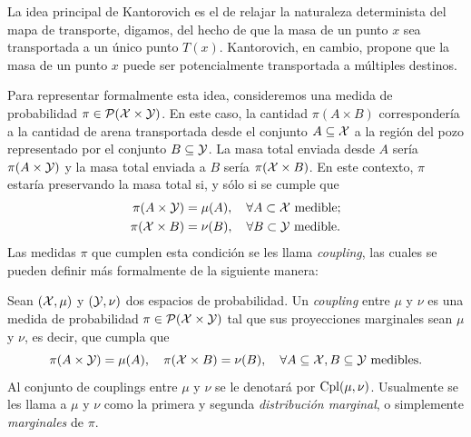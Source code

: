 {{	  La idea principal de Kantorovich es el de relajar la naturaleza determinista del mapa de transporte, digamos, del hecho de que la masa de un punto $x$ sea transportada a un único punto $T(x)$. Kantorovich, en cambio, propone que la masa de un punto $x$ puede ser potencialmente transportada a múltiples destinos.


	  Para representar formalmente esta idea, consideremos una medida de probabilidad $\pi \in \ProbSpace[\cX \times \cY]$. En este caso, la cantidad $\pi(A \times B)$ correspondería a la cantidad de arena transportada desde el conjunto $A \subseteq \cX$ a la región del pozo representado por el conjunto $B \subseteq \cY$. La masa total enviada desde $A$ sería $\pi(A \times \cY)$ y la masa total enviada a $B$ sería $\pi(\cX \times B)$. En este contexto, $\pi$ estaría preservando la masa total si, y sólo si se cumple que
	  \begin{align*}
		  \pi(A \times \cY) & = \mu(A), \quad \forall A \subset \cX \text{ medible;} \\
		  \pi(\cX \times B) & = \nu(B),\quad \forall B \subset \cY \text{ medible.}
	  \end{align*}
	  Las medidas $\pi$ que cumplen esta condición se les llama \emph{coupling}, las cuales se pueden definir más formalmente de la siguiente manera:

	  \begin{definition}[Coupling]
		  Sean $(\cX, \mu)$ y $(\cY, \nu)$ dos espacios de probabilidad. Un \emph{coupling} entre $\mu$ y $\nu$ es una medida de probabilidad $\pi \in \ProbSpace[\cX \times \cY]$ tal que sus proyecciones marginales sean $\mu$ y $\nu$, es decir, que cumpla que
		  \begin{equation}
			  \label{eq:coupling}
			  \pi(A \times \cY) = \mu(A), \quad \pi(\cX \times B) = \nu(B), \quad \forall A \subseteq \cX, B \subseteq \cY \text{ medibles}.
		  \end{equation}
		  Al conjunto de couplings entre $\mu$ y $\nu$ se le denotará por $\Cpl(\mu, \nu)$. Usualmente se les llama a $\mu$ y $\nu$ como la primera y segunda \emph{distribución marginal}, o simplemente \emph{marginales} de $\pi$.
	  \end{definition}

}}
